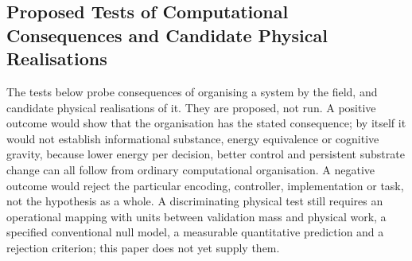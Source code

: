 \documentclass[11pt]{article}
\theoremstyle{remark}
\begin{document}
\subsection{Proposed Tests of Computational Consequences and Candidate Physical Realisations}
\label{sec:physical_tests}
The tests below probe consequences of organising a system by the field, and candidate physical realisations of it. They are proposed, not run. A positive outcome would show that the organisation has the stated consequence; by itself it would not establish informational substance, energy equivalence or cognitive gravity, because lower energy per decision, better control and persistent substrate change can all follow from ordinary computational organisation. A negative outcome would reject the particular encoding, controller, implementation or task, not the hypothesis as a whole. A discriminating physical test still requires an operational mapping with units between validation mass and physical work, a specified conventional null model, a measurable quantitative prediction and a rejection criterion; this paper does not yet supply them.
\end{document}
